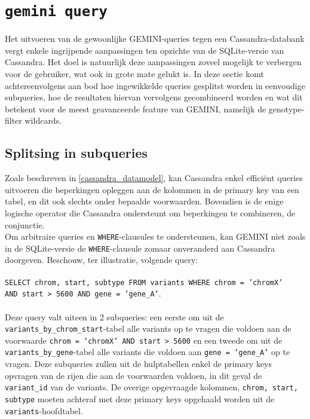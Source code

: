 \section{\texttt{gemini query}}
\label{gemini_query_concept}
Het uitvoeren van de gewoonlijke GEMINI-queries tegen een Cassandra-databank vergt enkele ingrijpende aanpassingen ten opzichte van de SQLite-versie van Cassandra. Het doel is natuurlijk deze aanpassingen zoveel mogelijk te verbergen voor de gebruiker, wat ook in grote mate gelukt is. In deze sectie komt achtereenvolgens aan bod hoe ingewikkelde queries gesplitst worden in eenvoudige subqueries, hoe de resultaten hiervan vervolgens gecombineerd worden en wat dit betekent voor de meest geavanceerde feature van GEMINI, namelijk de genotype-filter wildcards.

\subsection{Splitsing in subqueries}
\label{splitsing_subqueries_conceptueel}

Zoals beschreven in \ref{cassandra_datamodel}, kan Cassandra enkel effici\"ent queries uitvoeren die beperkingen opleggen aan de kolommen in de primary key van een tabel, en dit ook slechts onder bepaalde voorwaarden. Bovendien is de enige logische operator die Cassandra ondersteunt om beperkingen te combineren, de conjunctie.\\
Om arbitraire queries en \texttt{WHERE}-clausules te ondersteunen, kan GEMINI niet zoals in de SQLite-versie de \texttt{WHERE}-clausule zomaar onveranderd aan Cassandra doorgeven. Beschouw, ter illustratie, volgende query:\\\\
\texttt{SELECT chrom, start, subtype FROM variants WHERE chrom = 'chromX' \\AND start > 5600 AND gene = 'gene\_A'}.\\\\
Deze query valt uiteen in 2 subqueries: een eerste om uit de \texttt{variants\_by\_chrom\_start}-tabel alle variants op te vragen die voldoen aan de voorwaarde \texttt{chrom = 'chromX' AND start > 5600} en een tweede om uit de \texttt{variants\_by\_gene}-tabel alle variants die voldoen aan \texttt{gene = 'gene\_A'} op te vragen. Deze subqueries zullen uit de hulptabellen enkel de primary keys opvragen van de rijen die aan de voorwaarden voldoen, in dit geval de \texttt{variant\_id} van de variants. De overige opgevraagde kolommen, \texttt{chrom, start, subtype} moeten achteraf met deze primary keys opgehaald worden uit de \texttt{variants}-hoofdtabel.\\

